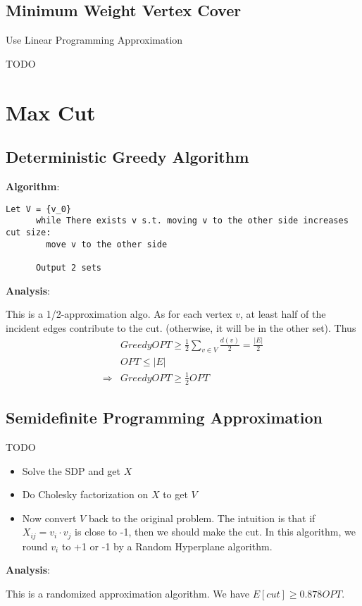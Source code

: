 \documentclass[11pt]{article}
\begin{document}
  \subsection{Minimum Weight Vertex Cover}
    Use Linear Programming Approximation
    
    TODO

\section{Max Cut}
  \subsection{Deterministic Greedy Algorithm}
    \textbf{Algorithm}:
    \begin{lstlisting}[frame=single]
      Let V = {v_0}
      while There exists v s.t. moving v to the other side increases cut size:
        move v to the other side

      Output 2 sets
    \end{lstlisting}

    \textbf{Analysis}:

      This is a 1/2-approximation algo. As for each vertex $v$, at least half of the incident edges contribute to the cut. (otherwise, it will be in the other set). Thus 
      \[
        \begin{split}
          & GreedyOPT \ge \frac{1}{2}\sum_{v \in V} \frac{d(v)}{2} = \frac{|E|}{2}\\
          & OPT \le |E|\\
          \Rightarrow & GreedyOPT \ge \frac{1}{2}OPT %
        \end{split}
      \]

  \subsection{Semidefinite Programming Approximation}
    TODO
    \begin{itemize}
      \item Solve the SDP and get $X$
      \item Do Cholesky factorization on $X$ to get $V$
      \item Now convert $V$ back to the original problem. The intuition is that if $X_{ij} = v_i \cdot v_j$ is close to -1, then we should make the cut. In this algorithm, we round $v_i$ to +1 or -1 by a Random Hyperplane algorithm.
    \end{itemize}
    \textbf{Analysis}:

      This is a randomized approximation algorithm. We have $E[cut]\ge 0.878 OPT$.
\end{document}
